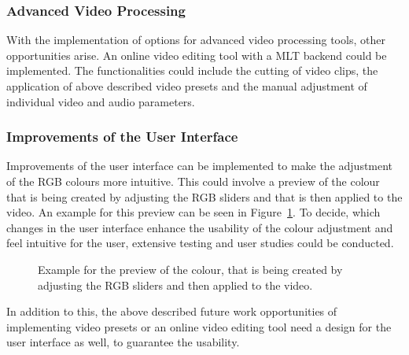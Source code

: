 \documentclass[../MasterThesis.tex]{subfiles}
\begin{document}
\subsubsection*{Advanced Video Processing}

With the implementation of options for advanced video processing tools, other opportunities arise. An online video editing tool with a MLT backend could be implemented. The functionalities could include the cutting of video clips, the application of above described video presets and the manual adjustment of individual video and audio parameters.










\subsubsection*{Improvements of the User Interface}


Improvements of the user interface can be implemented to make the adjustment of the RGB colours more intuitive. This could involve a preview of the colour that is being created by adjusting the RGB sliders and that is then applied to the video. An example for this preview can be seen in Figure~\ref{figure:UI}.
To decide, which changes in the user interface enhance the usability of the colour adjustment and feel intuitive for the user, extensive testing and user studies could be conducted.

\begin{figure}[H]
	\begin{center}
		\caption[Example for the colour preview of the RGB sliders.]{Example for the preview of the colour, that is being created by adjusting the RGB sliders and then applied to the video.}
		\label{figure:UI}
	\end{center}
\end{figure}



In addition to this, the above described future work opportunities of implementing video presets or an online video editing tool need a design for the user interface as well, to guarantee the usability. 
\end{document}
